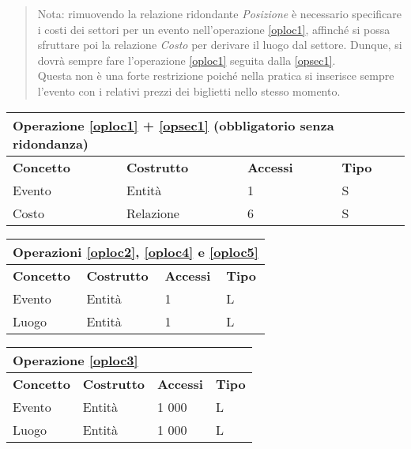 \documentclass[a4paper,11pt]{article}
\begin{document}
\begin{quote}
  Nota: rimuovendo la relazione ridondante \emph{Posizione} è necessario specificare i costi dei settori per un evento nell'operazione \ref{oploc1},
  affinché si possa sfruttare poi la relazione \emph{Costo} per derivare il luogo dal settore.
  Dunque, si dovrà sempre fare l'operazione \ref{oploc1} seguita dalla \ref{opsec1}.\\
  Questa non è una forte restrizione poiché nella pratica si
  inserisce sempre l'evento con i relativi prezzi dei biglietti nello stesso momento.
\end{quote}
\begin{tabularx}{\textwidth}{|X|X|X|X|}
\hline
  \multicolumn{4}{|l|}{\textbf{Operazione \ref{oploc1} + \ref{opsec1} (obbligatorio senza ridondanza)}} \\
\hline
\textbf{Concetto} & \textbf{Costrutto} & \textbf{Accessi} & \textbf{Tipo}\\
\hline
Evento & Entità & 1 & S \\
\hline
Costo & Relazione & 6 & S \\
\hline
\end{tabularx}
\newline
\vspace*{1em}
\newline
\begin{tabularx}{\textwidth}{|X|X|X|X|}
\hline
  \multicolumn{4}{|l|}{\textbf{Operazioni \ref{oploc2}, \ref{oploc4} e \ref{oploc5}}} \\
\hline
\textbf{Concetto} & \textbf{Costrutto} & \textbf{Accessi} & \textbf{Tipo}\\
\hline
Evento & Entità & 1 & L \\
\hline
Luogo & Entità & 1 & L \\
\hline
\end{tabularx}
\newline
\vspace*{1em}
\newline
\begin{tabularx}{\textwidth}{|X|X|X|X|}
\hline
  \multicolumn{4}{|l|}{\textbf{Operazione \ref{oploc3}}} \\
\hline
\textbf{Concetto} & \textbf{Costrutto} & \textbf{Accessi} & \textbf{Tipo}\\
\hline
Evento & Entità & 1 000 & L \\
\hline
Luogo & Entità & 1 000 & L \\
\hline
\end{tabularx}
\end{document}
